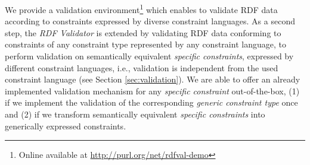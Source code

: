 \documentclass[a4paper,fontsize=11pt]{scrartcl}
\begin{document}
We provide a validation environment\footnote{Online available at \url{http://purl.org/net/rdfval-demo}} which enables to validate RDF data according to constraints expressed by diverse  constraint languages.
As a second step, the \emph{RDF Validator} is extended by validating RDF data conforming to constraints of any constraint type represented by any constraint language,  
to perform validation on semantically equivalent \emph{specific constraints}, expressed by different constraint languages, 
i.e., validation is independent from the used constraint language (see Section \ref{sec:validation}). 
We are able to offer an already implemented validation mechanism for any \emph{specific constraint} out-of-the-box, 
(1) if we implement the validation of the corresponding \emph{generic constraint type} once and 
(2) if we transform semantically equivalent \emph{specific constraints} into generically expressed constraints.  



\end{document}
